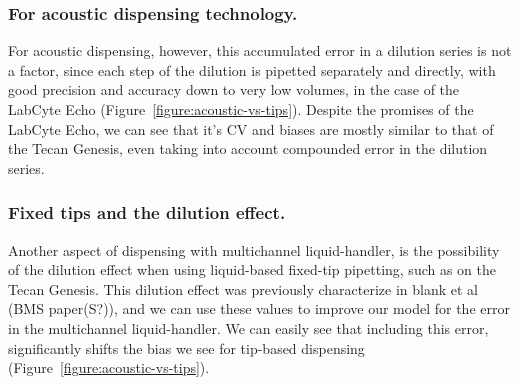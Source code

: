 \documentclass[aps,pre,twocolumn,nofootinbib,superscriptaddress,linenumbers]{revtex4-1}
\begin{document}
\subsubsection*{For acoustic dispensing technology.}

For acoustic dispensing, however, this accumulated error in a dilution series is not a factor, since each step of the dilution is pipetted separately and directly, with good precision and accuracy down to very low volumes, in the case of the LabCyte Echo (Figure~\ref{figure:acoustic-vs-tips}). Despite the promises of the LabCyte Echo, we can see that it's CV and biases are mostly similar to that of the Tecan Genesis, even taking into account compounded error in the dilution series.

\subsubsection*{Fixed tips and the dilution effect.}

Another aspect of dispensing with multichannel liquid-handler, is the possibility of the dilution effect when using liquid-based fixed-tip pipetting, such as on the Tecan Genesis. This dilution effect was previously characterize in blank et al (BMS paper(S?)), and we can use these values to improve our model for the error in the multichannel liquid-handler. We can easily see that including this error, significantly shifts the bias we see for tip-based dispensing (Figure~\ref{figure:acoustic-vs-tips}).

%
\end{document}
